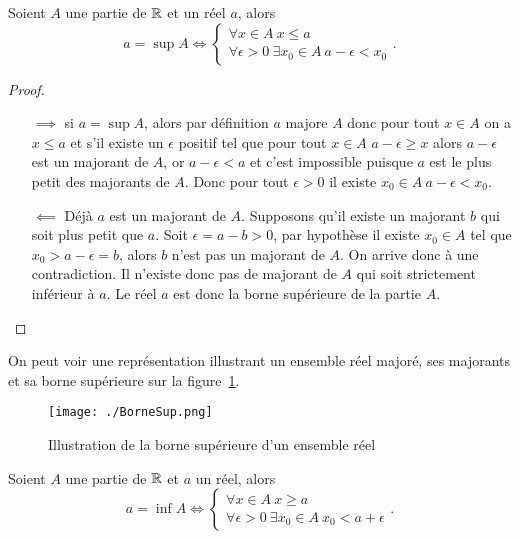 \begin{theo}
  Soient \(A\) une partie de \(\mathbb{R}\) et un réel \(a\), alors
  \begin{equation}
    a = \sup A \iff \begin{cases} \forall x \in A \ x\leqslant a \\  \forall
      \epsilon >0 \ \exists x_0 \in A \ a - \epsilon < x_0
    \end{cases}.
  \end{equation}
\end{theo}

\begin{proof}
  \begin{itemize}
    \item[\(\implies\)] si \(a = \sup A\), alors par définition \(a\) majore
      \(A\) donc pour tout \(x \in A\) on a \(x\leqslant a\) et s'il existe un
      \(\epsilon\) positif tel que pour tout \(x\in A\) \(a - \epsilon\geqslant
      x\) alors \(a - \epsilon\) est un majorant de \(A\), or \(a - \epsilon <
      a\) et c'est impossible puisque \(a\) est le plus petit des majorants de
      \(A\).  Donc pour tout \(\epsilon >0\) il existe \(x_0\in A \ a - \epsilon
      < x_0\).
    \item [\(\impliedby\)] Déjà \(a\) est un majorant de \(A\). Supposons qu'il
      existe un majorant \(b\) qui soit plus petit que \(a\). Soit \(\epsilon =
      a - b>0\), par hypothèse il existe \(x_0\in A\) tel que \(x_0>a - \epsilon
      = b\), alors \(b\) n'est pas un majorant de \(A\). On arrive donc à une
      contradiction. Il n'existe donc pas de majorant de \(A\) qui soit
      strictement inférieur à \(a\). Le réel \(a\) est donc la borne supérieure
      de la partie \(A\).
  \end{itemize}
\end{proof}
On peut voir une représentation illustrant un ensemble réel majoré, ses majorants
et sa borne supérieure sur la figure~\ref{fig:BorneSup}.
\begin{figure}[h]
  \centering
  \texttt{[image: ./BorneSup.png]}
  \caption{Illustration de la borne supérieure d'un ensemble réel}
  \label{fig:BorneSup}
\end{figure}
\begin{theo}
  Soient \(A\) une partie de \(\mathbb{R}\) et \(a\) un réel, alors
  \begin{equation}
    a = \inf A \iff \begin{cases} \forall x \in A \ x\geqslant a \\  \forall
    \epsilon >0 \ \exists x_0\in A \ x_0<a + \epsilon\end{cases}.
  \end{equation}
\end{theo}
